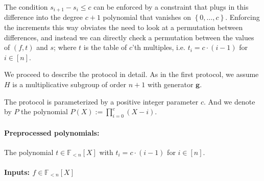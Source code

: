 \documentclass[11pt]{article} %
\newcommand{\F}{\ensuremath{\mathbb F}\xspace}
\newcommand{\defeq}{:=}
\newcommand{\set}[1]{\ensuremath{\left\{#1\right\}}\xspace}
\newcommand{\hgen}{\ensuremath{\mathbf{g}}\xspace}
\newcommand{\polysofdeg}[1]{\ensuremath{\F_{< #1}[X]}\xspace}
\begin{document}
The condition $s_{i+1}-s_i \leq c$ can be enforced by a constraint that plugs in this difference into the degree $c+1$ polynomial that vanishes on \set{0,\ldots,c}. Enforcing the increments this way obviates the need to look at a permutation between differences, and instead we can directly check a permutation between the values of $(f,t)$ and $s$; where $t$ is the table of $c$'th multiples, i.e. $t_i = c\cdot (i-1)$ for $i\in [n]$.

We proceed to describe the protocol in detail.
As in the first protocol, we assume $H$ is a multiplicative subgroup of order $n+1$ with generator \hgen.

The protocol is parameterized by a positive integer parameter $c$.
And we denote by $P$ the polynomial
$P(X)\defeq \prod_{i= 0}^c(X-i)$.
\paragraph{Preprocessed polynomials:}
The polynomial $t \in \polysofdeg{n}$  with $t_i = c\cdot (i-1)$ for $i\in [n]$.

\paragraph{Inputs: $f\in \polysofdeg{n}$}
\end{document}
